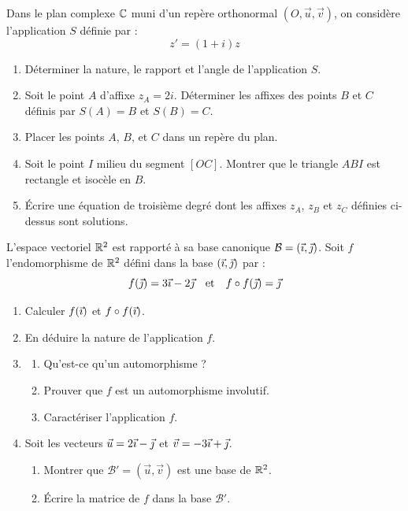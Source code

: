 \documentclass[11pt]{article}
\begin{document}


Dans le plan complexe $\mathbb{C}$ muni d'un repère orthonormal $(O,\vec{u},\vec{v})$, on considère l'application $S$ définie par :
\[ z' = (1 + i)z \]

\begin{enumerate}
  \item Déterminer la nature, le rapport et l'angle de l'application $S$.
  \item Soit le point $A$ d'affixe $z_A = 2i$. Déterminer les affixes des points $B$ et $C$ définis par $S(A) = B$ et $S(B) = C$.
  \item Placer les points $A$, $B$, et $C$ dans un repère du plan.
  \item Soit le point $I$ milieu du segment $[OC]$. Montrer que le triangle $ABI$ est rectangle et isocèle en $B$.
  \item Écrire une équation de troisième degré dont les affixes $z_A$, $z_B$ et $z_C$ définies ci-dessus sont solutions.
\end{enumerate}


L'espace vectoriel $\mathbb{R}^2$ est rapporté à sa base canonique $\mathcal{B} = (\vec{\imath},\vec{\jmath})$. Soit $f$ l'endomorphisme de $\mathbb{R}^2$ défini dans la base $(\vec{\imath},\vec{\jmath})$ par :
\[ f(\vec{\jmath}) = 3\vec{\imath} - 2\vec{\jmath} \quad \text{et} \quad f \circ f(\vec{\jmath}) = \vec{\jmath} \]

\begin{enumerate}
  \item Calculer $f(\vec{\imath})$ et $f \circ f(\vec{\imath})$.
  \item En déduire la nature de l'application $f$.
  \item \begin{enumerate}[label=\alph*.]
    \item Qu'est-ce qu'un automorphisme ?
    \item Prouver que $f$ est un automorphisme involutif.
    \item Caractériser l'application $f$.
  \end{enumerate}
  \item Soit les vecteurs $\vec{u} = 2\vec{\imath} - \vec{\jmath}$ et $\vec{v} = -3\vec{\imath} + \vec{\jmath}$.
  \begin{enumerate}[label=\alph*.]
    \item Montrer que $\mathcal{B}' = (\vec{u},\vec{v})$ est une base de $\mathbb{R}^2$.
    \item Écrire la matrice de $f$ dans la base $\mathcal{B}'$.
  \end{enumerate}
\end{enumerate}
\end{document}
